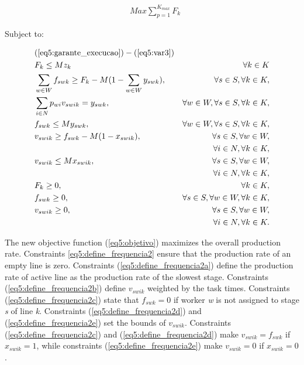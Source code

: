 \documentclass{singlecol-new}
\begin{document}
\begin{align}
& \displaystyle Max \sum_{p = 1}^{K_{max}} F_k \label{eq5:objetivo}
\end{align}

Subject to:

\begin{align}
& (\ref{eq5:garante_execucao}) - (\ref{eq5:var3})&\\
& \displaystyle F_k \leq M z_k & \forall k \in K \label{eq5:define_frequencia2}\\
& \displaystyle \sum_{w \in W} f_{swk} \geq F_k - M(1 - \sum_{w \in W} y_{swk}), & \forall s \in S, \forall k \in K, \label{eq5:define_frequencia2a} \\
& \displaystyle \sum_{i \in N} p_{wi}v_{swik} = y_{swk}, & \forall w \in W, \forall s \in S, \forall k \in K, \label{eq5:define_frequencia2b} \\
& \displaystyle f_{swk} \leq My_{swk}, & \forall w \in W, \forall s \in S, \forall k \in K, \label{eq5:define_frequencia2c} \\
& \displaystyle v_{swik} \geq f_{swk} - M(1 - x_{swik}), & \forall s \in S, \forall w \in W,\label{eq5:define_frequencia2d}\\
&\qquad &\qquad \forall i \in N, \forall k \in K, \nonumber \\
& \displaystyle v_{swik} \leq Mx_{swik}, & \forall s \in S, \forall w \in W,\label{eq5:define_frequencia2e}\\
&\qquad &\qquad \forall i \in N, \forall k \in K, \nonumber\\
& \displaystyle F_k \geq 0, & \forall k \in K,\label{eq5:var4}\\
& \displaystyle f_{swk} \geq 0, & \forall s \in S, \forall w \in W, \forall k \in K,\label{eq5:var5}\\
& \displaystyle v_{swik} \geq 0, & \forall s \in S, \forall w \in W,\label{eq5:var6}\\
&\qquad &\qquad \forall i \in N, \forall k \in K. \nonumber
\end{align}

The new objective function (\ref{eq5:objetivo}) maximizes the overall production rate. Constraints \ref{eq5:define_frequencia2} ensure that the production rate of an empty line is zero. Constraints (\ref{eq5:define_frequencia2a}) define the production rate of active line as the production rate of the slowest stage. Constraints (\ref{eq5:define_frequencia2b}) define $v_{swik}$ weighted by the task times. Constraints (\ref{eq5:define_frequencia2c}) state that $f_{swk} = 0$ if worker \textit{w} is not assigned to stage \textit{s} of line \textit{k}. Constraints (\ref{eq5:define_frequencia2d}) and (\ref{eq5:define_frequencia2e}) set the bounds of $v_{swik}$. Constraints (\ref{eq5:define_frequencia2c}) and (\ref{eq5:define_frequencia2d}) make $v_{swik} = f_{swk}$ if $x_{swik} = 1$, while constraints (\ref{eq5:define_frequencia2e}) make $v_{swik} = 0$ if $x_{swik} = 0$.
  
\end{document}

